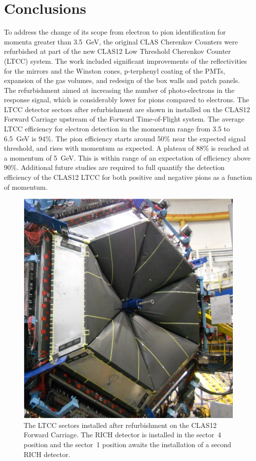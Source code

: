 \section{Conclusions}

To address the change of its scope from electron to pion identification for momenta greater than 3.5~GeV,
the original CLAS Cherenkov Counters were refurbished at part of the new CLAS12 Low Threshold Cherenkov
Counter (LTCC) system. The work included significant improvements of the reflectivities for the mirrors and the Winston
cones, p-terphenyl coating of the PMTs, expansion of the gas volumes, and redesign of the box walls and patch
panels. The refurbishment aimed at increasing the number of photo-electrons in the response signal, which is considerably
lower for pions compared to electrons.
The LTCC detector sectors after refurbishment are shown in  installed on the CLAS12
Forward Carriage upstream of the Forward Time-of-Flight system. The average LTCC efficiency for electron
detection in the momentum range from 3.5 to 6.5~GeV is 94\%. The pion efficiency starts around 50\% near
the expected signal threshold, and rises with momentum as expected. A plateau of 88\% is reached at a momentum
of 5~GeV. This is within range of an expectation of efficiency above 90\%. Additional future studies are required
to full quantify the detection efficiency of the CLAS12 LTCC for both positive and negative pions as a function of
momentum.

\begin{figure}
    \centering
    \includegraphics[width=1.0\columnwidth, height=1.1\columnwidth]{img/ltccInstalled.png}
    \caption{The LTCC sectors installed after refurbishment on the CLAS12 Forward Carriage. The RICH detector
    is installed in the sector~4 position and the sector~1 position awaits the installation of a second RICH detector.}
    \label{fig:ltccInstalled}
\end{figure}

